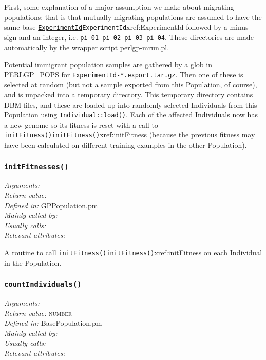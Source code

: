 \documentclass[a4paper]{article}
\begin{document}
First, some explanation of a major assumption we make about migrating
populations: that is that mutually migrating populations are assumed
to have the same base \hyperref[no]{\texttt{ExperimentId}}{\texttt{ExperimentId}}{xref:ExperimentId} followed by a minus sign
and an integer, i.e. \verb:pi-01 pi-02 pi-03 pi-04:.  These
directories are made automatically by the wrapper script
perlgp-mrun.pl.

Potential immigrant population samples are gathered by a glob in
PERLGP\_POPS for \texttt{ExperimentId-*.export.tar.gz}.  Then one of
these is selected at random (but not a sample exported from this
Population, of course), and is unpacked into a temporary directory.
This temporary directory contains DBM files, and these are loaded up
into randomly selected Individuals from this Population using
\texttt{Individual::load()}.  Each of the affected Individuals now has
a new genome so its fitness is reset with a call to
\hyperref[no]{\texttt{initFitness()}}{\texttt{initFitness()}}{xref:initFitness} (because the previous fitness may have been
calculated on different training examples in the other Population).

\subsubsection{\texttt{initFitnesses()}}\label{xref:initFitnesses}
\begin{flushleft}
\textit{Arguments:} \\
\textit{Return value:} \\
\textit{Defined in:} GPPopulation.pm\\
\textit{Mainly called by:} \\
\textit{Usually calls:} \\
\textit{Relevant attributes:}
\end{flushleft}

A routine to call \hyperref[no]{\texttt{initFitness()}}{\texttt{initFitness()}}{xref:initFitness} on each Individual in the
Population.

\subsubsection{\texttt{countIndividuals()}}\label{xref:countIndividuals}
\begin{flushleft}
\textit{Arguments:} \\
\textit{Return value:} \textsc{number}\\
\textit{Defined in:} BasePopulation.pm\\
\textit{Mainly called by:} \\
\textit{Usually calls:} \\
\textit{Relevant attributes:}
\end{flushleft}
\end{document}
